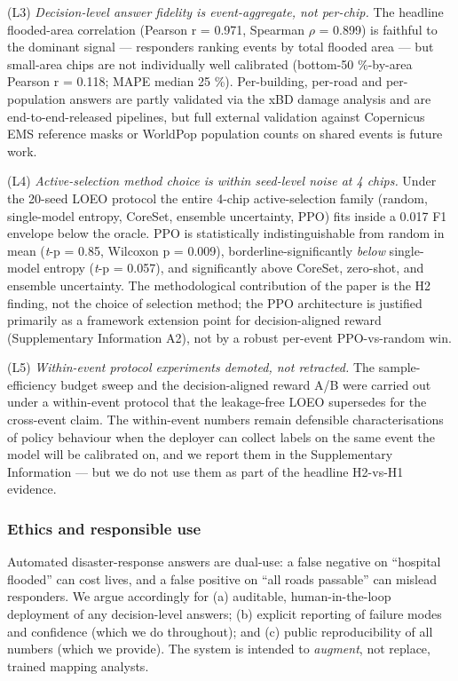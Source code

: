 (L3) \emph{Decision-level answer fidelity is event-aggregate, not per-chip.}
The headline flooded-area correlation (Pearson r = 0.971, Spearman $\rho$ =
0.899) is faithful to the dominant signal --- responders ranking events
by total flooded area --- but small-area chips are not individually well
calibrated (bottom-50 \%-by-area Pearson r = 0.118; MAPE median 25 \%).
Per-building, per-road and per-population answers are partly validated
via the xBD damage analysis and are end-to-end-released pipelines, but
full external validation against Copernicus EMS reference masks or
WorldPop population counts on shared events is future work.

(L4) \emph{Active-selection method choice is within seed-level noise at
4 chips.} Under the 20-seed LOEO protocol the entire 4-chip
active-selection family (random, single-model entropy, CoreSet,
ensemble uncertainty, PPO) fits inside a 0.017 F1 envelope below the
oracle. PPO is statistically indistinguishable from random in mean
(\emph{t}-p = 0.85, Wilcoxon p = 0.009), borderline-significantly \emph{below}
single-model entropy (\emph{t}-p = 0.057), and significantly above CoreSet,
zero-shot, and ensemble uncertainty. The methodological contribution of
the paper is the H2 finding, not the choice of selection method; the
PPO architecture is justified primarily as a framework extension point
for decision-aligned reward (Supplementary Information A2), not by a
robust per-event PPO-vs-random win.

(L5) \emph{Within-event protocol experiments demoted, not retracted.} The
sample-efficiency budget sweep and the decision-aligned reward A/B
were carried out under a within-event protocol that the leakage-free
LOEO supersedes for the cross-event claim. The within-event numbers
remain defensible characterisations of policy behaviour when the
deployer can collect labels on the same event the model will be
calibrated on, and we report them in the Supplementary Information ---
but we do not use them as part of the headline H2-vs-H1 evidence.

\subsubsection{Ethics and responsible use}\label{ethics-and-responsible-use}

Automated disaster-response answers are dual-use: a false negative on
``hospital flooded'' can cost lives, and a false positive on ``all roads
passable'' can mislead responders. We argue accordingly for (a) auditable,
human-in-the-loop deployment of any decision-level answers; (b) explicit
reporting of failure modes and confidence (which we do throughout); and
(c) public reproducibility of all numbers (which we provide). The system is
intended to \emph{augment}, not replace, trained mapping analysts.

